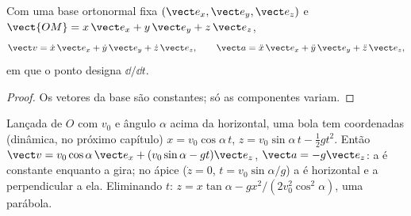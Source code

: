 \begin{proposition}\label{prop:b1:point-kinematics:cartesian}
Com uma base ortonormal fixa $(\vect e_x, \vect e_y, \vect e_z)$ e
$\vect{OM} = x\,\vect e_x + y\,\vect e_y + z\,\vect e_z$,
\[
\vect v = \dot x\,\vect e_x + \dot y\,\vect e_y + \dot z\,\vect e_z, \qquad
\vect a = \ddot x\,\vect e_x + \ddot y\,\vect e_y + \ddot z\,\vect e_z,
\]
em que o ponto designa $\dd/\dd t$.
\end{proposition}

\begin{proof}
Os vetores da base são constantes; só as componentes variam.
\end{proof}

\begin{example}[Projétil]\label{ex:b1:point-kinematics:projectile}
Lançada de $O$ com  $v_0$ e ângulo $\alpha$ acima da
horizontal, uma bola tem coordenadas (dinâmica, no próximo capítulo)
$x = v_0\cos\alpha\,t$, $z = v_0\sin\alpha\,t - \tfrac12 gt^2$. Então
$\vect v = v_0\cos\alpha\,\vect e_x + (v_0\sin\alpha - gt)\vect e_z$,
$\vect a = -g\vect e_z$: a  é constante enquanto a
 gira; no ápice ($\dot z = 0$, $t = v_0\sin\alpha/g$) a
 é horizontal e a  perpendicular a ela.
Eliminando $t$: $z = x\tan\alpha - gx^2/(2v_0^2\cos^2\alpha)$, uma
parábola.
\end{example}

